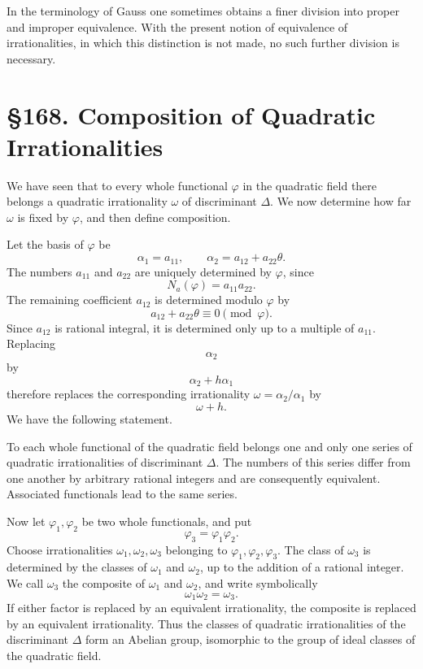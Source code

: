 \documentclass[12pt,a4paper]{article}
\newcommand{\webersection}[2]{\clearpage\section*{\S #1. #2}}
\begin{document}
In the terminology of Gauss one sometimes obtains a finer division into proper and improper equivalence.  With the present notion of equivalence of irrationalities, in which this distinction is not made, no such further division is necessary.

\webersection{168}{Composition of Quadratic Irrationalities}

We have seen that to every whole functional \(\varphi\) in the quadratic field there belongs a quadratic irrationality \(\omega\) of discriminant \(\Delta\).  We now determine how far \(\omega\) is fixed by \(\varphi\), and then define composition.

Let the basis of \(\varphi\) be
\[
  \alpha_1=a_{11},\qquad
  \alpha_2=a_{12}+a_{22}\theta.
\tag{1}
\]
The numbers \(a_{11}\) and \(a_{22}\) are uniquely determined by \(\varphi\), since
\[
  N_a(\varphi)=a_{11}a_{22}.
\tag{2}
\]
The remaining coefficient \(a_{12}\) is determined modulo \(\varphi\) by
\[
  a_{12}+a_{22}\theta\equiv0\pmod{\varphi}.
\tag{3}
\]
Since \(a_{12}\) is rational integral, it is determined only up to a multiple of \(a_{11}\).  Replacing
\[
  \alpha_2
\]
by
\[
  \alpha_2+h\alpha_1
\]
therefore replaces the corresponding irrationality \(\omega=\alpha_2/\alpha_1\) by
\[
  \omega+h.
\]
We have the following statement.

To each whole functional of the quadratic field belongs one and only one series of quadratic irrationalities of discriminant \(\Delta\).  The numbers of this series differ from one another by arbitrary rational integers and are consequently equivalent.  Associated functionals lead to the same series.

Now let \(\varphi_1,\varphi_2\) be two whole functionals, and put
\[
  \varphi_3=\varphi_1\varphi_2.
\tag{4}
\]
Choose irrationalities \(\omega_1,\omega_2,\omega_3\) belonging to \(\varphi_1,\varphi_2,\varphi_3\).  The class of \(\omega_3\) is determined by the classes of \(\omega_1\) and \(\omega_2\), up to the addition of a rational integer.  We call \(\omega_3\) the composite of \(\omega_1\) and \(\omega_2\), and write symbolically
\[
  \omega_1\omega_2=\omega_3.
\tag{5}
\]
If either factor is replaced by an equivalent irrationality, the composite is replaced by an equivalent irrationality.  Thus the classes of quadratic irrationalities of the discriminant \(\Delta\) form an Abelian group, isomorphic to the group of ideal classes of the quadratic field.
\end{document}
